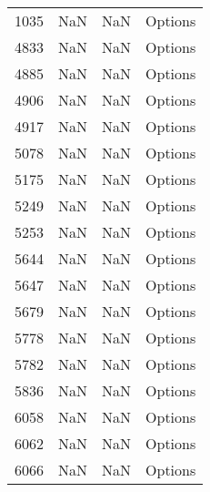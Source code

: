 \begin{tabular}{llll}
1035 &                   NaN &                        NaN &                                   Options \\
4833 &                   NaN &                        NaN &                                   Options \\
4885 &                   NaN &                        NaN &                                   Options \\
4906 &                   NaN &                        NaN &                                   Options \\
4917 &                   NaN &                        NaN &                                   Options \\
5078 &                   NaN &                        NaN &                                   Options \\
5175 &                   NaN &                        NaN &                                   Options \\
5249 &                   NaN &                        NaN &                                   Options \\
5253 &                   NaN &                        NaN &                                   Options \\
5644 &                   NaN &                        NaN &                                   Options \\
5647 &                   NaN &                        NaN &                                   Options \\
5679 &                   NaN &                        NaN &                                   Options \\
5778 &                   NaN &                        NaN &                                   Options \\
5782 &                   NaN &                        NaN &                                   Options \\
5836 &                   NaN &                        NaN &                                   Options \\
6058 &                   NaN &                        NaN &                                   Options \\
6062 &                   NaN &                        NaN &                                   Options \\
6066 &                   NaN &                        NaN &                                   Options \\

\end{tabular}
